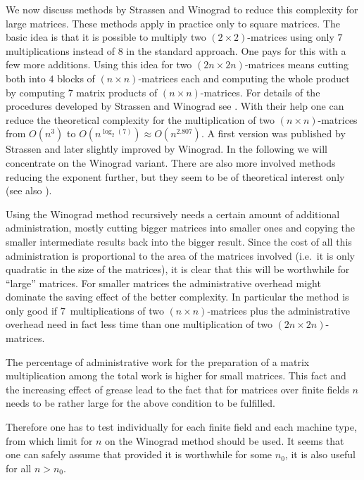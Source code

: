 We now discuss methods by Strassen and Winograd to reduce this complexity
%
for large matrices. These methods apply in practice only to square matrices.
The basic idea is that it is possible to multiply two $(2 \times 2)$-matrices
using only $7$ multiplications instead of $8$ in the standard approach.
One pays for this with a few more additions. Using this idea for two 
$(2n \times 2n)$-matrices means cutting both into $4$ blocks of 
$(n\times n)$-matrices each and computing the whole product by computing
$7$ matrix products of $(n \times n)$-matrices. For details of the
procedures developed by Strassen and Winograd see \cite[4.6.4]{AOCP2}.
%
With their help one can reduce the theoretical complexity for the 
multiplication of two $(n \times n)$-matrices from $O(n^3)$
to $O(n^{\log_2(7)}) \approx O(n^{2.807})$. 
A first version was published by Strassen and later slightly improved by
Winograd. In the following we will concentrate on the Winograd
variant.
There are also more involved methods reducing the exponent
further, but they seem to be of theoretical interest only (see 
also \cite[4.6.4]{AOCP2}).

Using the Winograd method recursively needs a certain amount of
%
additional administration, mostly cutting bigger matrices into smaller
ones and copying the smaller intermediate results back into the
bigger result. Since the cost of all this administration is proportional
to the area of the matrices involved (i.e.~it is only quadratic in the
size of the matrices), it is clear that this will be worthwhile for 
``large'' matrices. For smaller matrices the administrative overhead
might dominate the saving effect of the better complexity.
In particular the method is only good if $7$~multiplications of two $(n
\times n)$-matrices plus the administrative overhead need in fact less
time than one multiplication of two $(2n \times 2n)$-matrices.

The percentage of administrative work for the preparation of a matrix
multiplication among the total work is higher for small matrices.
This fact and the increasing effect of grease lead to the
fact that for matrices over finite fields $n$ needs to be rather large
for the above condition to be fulfilled. 

Therefore one has to test individually for each finite field and each
machine type, from which limit for $n$ on the Winograd method should
be used. It seems that one can safely assume that provided it is 
worthwhile for some $n_0$, it is also useful for all $n > n_0$. 

